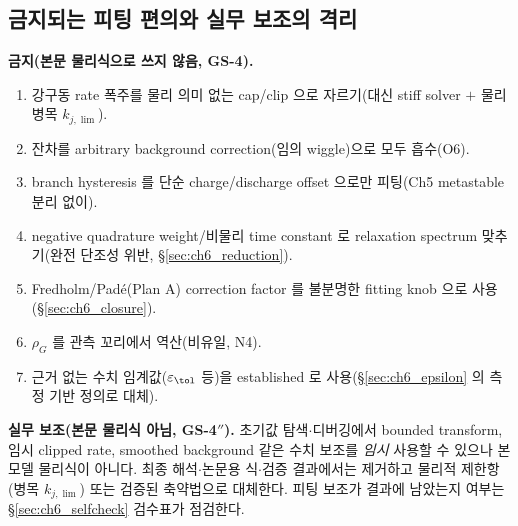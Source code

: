 \subsection{금지되는 피팅 편의와 실무 보조의 격리}\label{sec:ch6_forbidden}
\textbf{금지(본문 물리식으로 쓰지 않음, GS-4).}
\begin{enumerate}[label=(\arabic*),leftmargin=2.4em]
\item 강구동 rate 폭주를 물리 의미 없는 cap/clip 으로 자르기(대신 stiff solver $+$ 물리 병목 $k_{j,\lim}$).
\item 잔차를 arbitrary background correction(임의 wiggle)으로 모두 흡수(O6).
\item branch hysteresis 를 단순 charge/discharge offset 으로만 피팅(Ch5 metastable 분리 없이).
\item negative quadrature weight/비물리 time constant 로 relaxation spectrum 맞추기(완전 단조성 위반, \S\ref{sec:ch6_reduction}).
\item Fredholm/Padé(Plan A) correction factor 를 불분명한 fitting knob 으로 사용(\S\ref{sec:ch6_closure}).
\item $\rho_G$ 를 관측 꼬리에서 역산(비유일, N4).
\item 근거 없는 수치 임계값($\varepsilon_\tol$ 등)을 established 로 사용(\S\ref{sec:ch6_epsilon} 의 측정 기반 정의로 대체).
\end{enumerate}
\begin{practicebox}
\textbf{실무 보조(본문 물리식 아님, GS-4$''$).} 초기값 탐색$\cdot$디버깅에서 bounded transform, 임시 clipped rate,
smoothed background 같은 수치 보조를 \emph{임시} 사용할 수 있으나 본 모델 물리식이 아니다. 최종 해석$\cdot$논문용
식$\cdot$검증 결과에서는 제거하고 물리적 제한항(병목 $k_{j,\lim}$) 또는 검증된 축약법으로 대체한다. 피팅 보조가
결과에 남았는지 여부는 \S\ref{sec:ch6_selfcheck} 검수표가 점검한다.
\end{practicebox}

